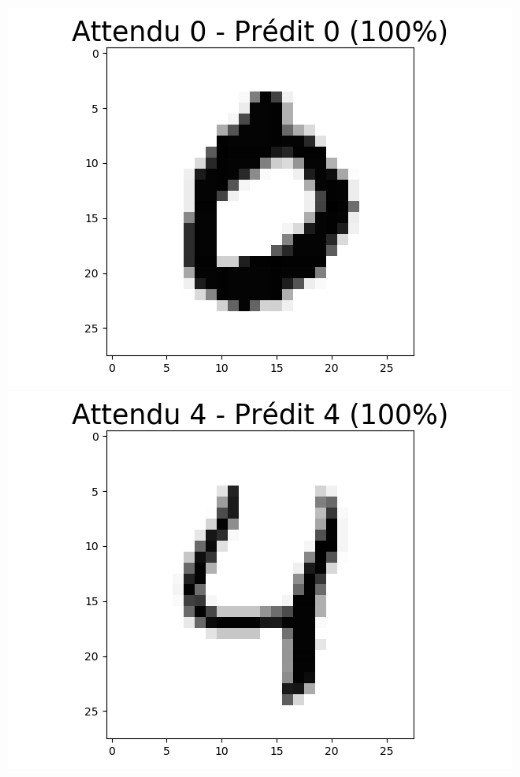 \documentclass[11pt,class=report,crop=false]{standalone}
\begin{document}
\begin{center}
\includegraphics[scale=\myscale,scale=0.20]{figures/tfconv-chiffre-test-result-3}
\includegraphics[scale=\myscale,scale=0.20]{figures/tfconv-chiffre-test-result-4}
\end{center}
\end{document}
